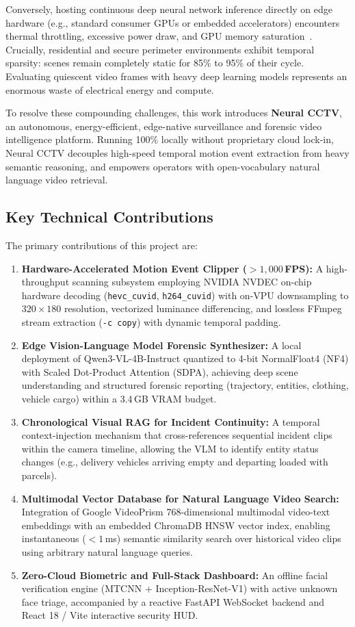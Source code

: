\documentclass[10pt, conference]{IEEEtran}
\begin{document}
Conversely, hosting continuous deep neural network inference directly on edge hardware (e.g., standard consumer GPUs or embedded accelerators) encounters thermal throttling, excessive power draw, and GPU memory saturation~\cite{kang2017noscope}. Crucially, residential and secure perimeter environments exhibit temporal sparsity: scenes remain completely static for 85\% to 95\% of their cycle. Evaluating quiescent video frames with heavy deep learning models represents an enormous waste of electrical energy and compute.

To resolve these compounding challenges, this work introduces \textbf{Neural CCTV}, an autonomous, energy-efficient, edge-native surveillance and forensic video intelligence platform. Running 100\% locally without proprietary cloud lock-in, Neural CCTV decouples high-speed temporal motion event extraction from heavy semantic reasoning, and empowers operators with open-vocabulary natural language video retrieval.

\subsection{Key Technical Contributions}
The primary contributions of this project are:
\begin{enumerate}
    \item \textbf{Hardware-Accelerated Motion Event Clipper ($>1,000$\,FPS):} A high-throughput scanning subsystem employing NVIDIA NVDEC on-chip hardware decoding (\texttt{hevc\_cuvid}, \texttt{h264\_cuvid}) with on-VPU downsampling to $320 \times 180$ resolution, vectorized luminance differencing, and lossless FFmpeg stream extraction (\texttt{-c copy}) with dynamic temporal padding.
    \item \textbf{Edge Vision-Language Model Forensic Synthesizer:} A local deployment of Qwen3-VL-4B-Instruct quantized to 4-bit NormalFloat4 (NF4) with Scaled Dot-Product Attention (SDPA), achieving deep scene understanding and structured forensic reporting (trajectory, entities, clothing, vehicle cargo) within a 3.4\,GB VRAM budget.
    \item \textbf{Chronological Visual RAG for Incident Continuity:} A temporal context-injection mechanism that cross-references sequential incident clips within the camera timeline, allowing the VLM to identify entity status changes (e.g., delivery vehicles arriving empty and departing loaded with parcels).
    \item \textbf{Multimodal Vector Database for Natural Language Video Search:} Integration of Google VideoPrism 768-dimensional multimodal video-text embeddings with an embedded ChromaDB HNSW vector index, enabling instantaneous ($<1$\,ms) semantic similarity search over historical video clips using arbitrary natural language queries.
    \item \textbf{Zero-Cloud Biometric and Full-Stack Dashboard:} An offline facial verification engine (MTCNN + Inception-ResNet-V1) with active unknown face triage, accompanied by a reactive FastAPI WebSocket backend and React 18 / Vite interactive security HUD.
\end{enumerate}
\end{document}
